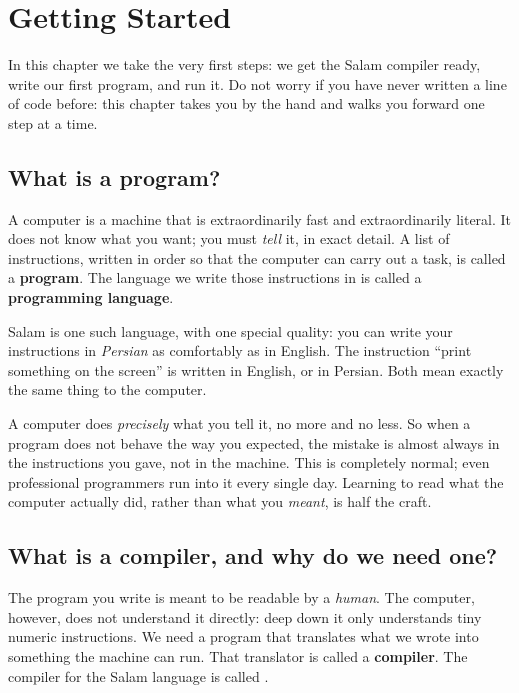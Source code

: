 \chapter{Getting Started}%
\label{ch:getting-started}

In this chapter we take the very first steps: we get the Salam compiler ready,
write our first program, and run it. Do not worry if you have never written a
line of code before: this chapter takes you by the hand and walks you forward
one step at a time.

\section{What is a program?}

A computer is a machine that is extraordinarily fast and extraordinarily
literal. It does not know what you want; you must \emph{tell} it, in exact
detail. A list of instructions, written in order so that the computer can carry
out a task, is called a \textbf{program}. The language we write those
instructions in is called a \textbf{programming language}.

Salam is one such language, with one special quality: you can write your
instructions in \emph{Persian} as comfortably as in English. The instruction
``print something on the screen'' is written  in English,
or  in Persian. Both mean exactly the same thing to
the computer.

\begin{note}
A computer does \emph{precisely} what you tell it, no more and no less. So when
a program does not behave the way you expected, the mistake is almost always in
the instructions you gave, not in the machine. This is completely normal; even
professional programmers run into it every single day. Learning to read what the
computer actually did, rather than what you \emph{meant}, is half the craft.
\end{note}

\section{What is a compiler, and why do we need one?}

The program you write is meant to be readable by a \emph{human}. The computer,
however, does not understand it directly: deep down it only understands tiny
numeric instructions. We need a program that translates what we wrote into
something the machine can run. That translator is called a \textbf{compiler}.
The compiler for the Salam language is called .

